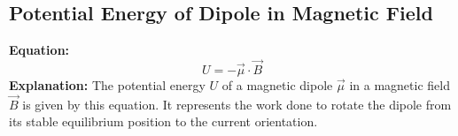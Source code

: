 \documentclass{article}
\begin{document}
\subsection*{Potential Energy of Dipole in Magnetic Field}
\textbf{Equation:} 
\[ U = -\vec{\mu} \cdot \vec{B} \]
\textbf{Explanation:} 
The potential energy \( U \) of a magnetic dipole \( \vec{\mu} \) in a magnetic field \( \vec{B} \) is given by this equation. It represents the work done to rotate the dipole from its stable equilibrium position to the current orientation.
\end{document}
